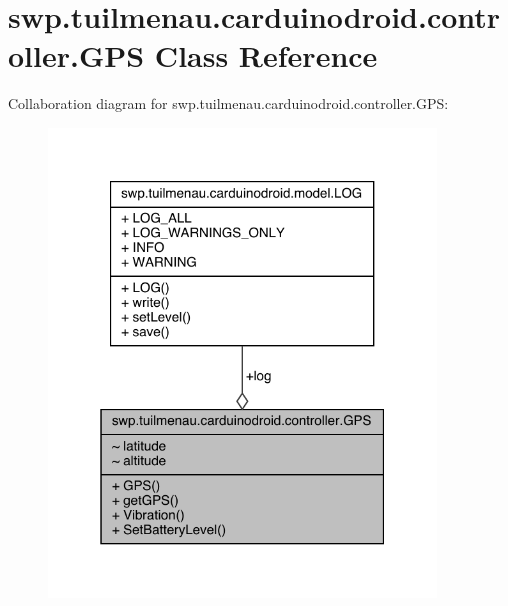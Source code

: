\hypertarget{classswp_1_1tuilmenau_1_1carduinodroid_1_1controller_1_1_g_p_s}{}\section{swp.\+tuilmenau.\+carduinodroid.\+controller.\+G\+P\+S Class Reference}
\label{classswp_1_1tuilmenau_1_1carduinodroid_1_1controller_1_1_g_p_s}


Collaboration diagram for swp.\+tuilmenau.\+carduinodroid.\+controller.\+G\+P\+S\+:
\nopagebreak
\begin{figure}[H]
\begin{center}
\leavevmode
\includegraphics[width=292pt]{classswp_1_1tuilmenau_1_1carduinodroid_1_1controller_1_1_g_p_s__coll__graph}
\end{center}
\end{figure}
